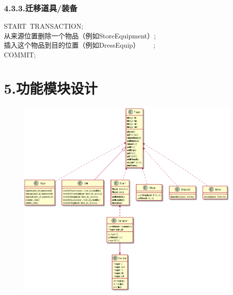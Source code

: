 \documentclass{article}
\begin{document}
\subsubsection{4.3.3.\hspace*{0.5em}迁移道具/装备}\label{433}%
\begin{mdpre}%
\noindent START~TRANSACTION;\\
从来源位置删除一个物品（例如StoreEquipment）;~~~~~~~~~~~~~~\\
插入这个物品到目的位置（例如DressEquip）~~~~;\\
COMMIT;%
\end{mdpre}
\section{5.\hspace*{0.5em}功能模块设计}\label{5}%

\begin{figure}[tbp]%
\begin{mdcenter}%

\noindent{}\includegraphics[keepaspectratio=true,width=\dimwidth{1.00}]{./img/10}{}%

\mdhr{}%

\noindent{}%
\end{mdcenter}%
\end{figure}%
\end{document}
